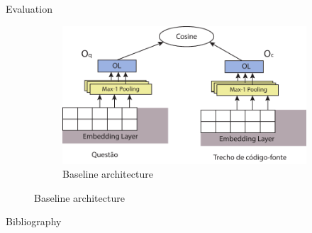 \documentclass{beamer}
\begin{document}
\begin{frame}{Evaluation}
\begin{figure}
          \begin{subfigure}[h]{0.45\textwidth}
            \includegraphics[width=\textwidth]{resources/embedding-architecture.pdf}
            \caption{Baseline architecture}
            \label{fig:baseline-one-architecture}
          \end{subfigure}
        \end{figure}
    \end{frame}

    
\appendix
    \begin{frame}[label=bibliography]{Bibliography}
      
      
      
    \end{frame}

  
\end{document}
